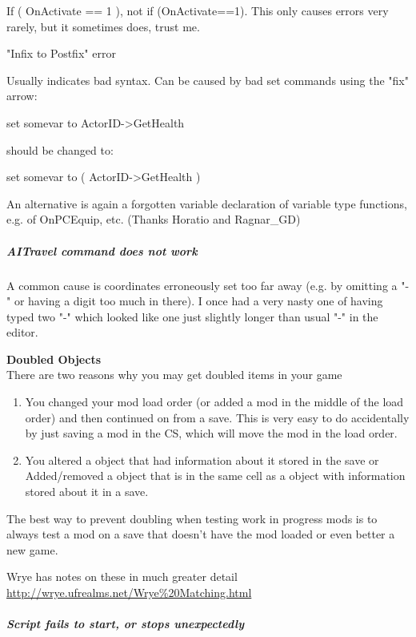 If ( OnActivate == 1 ), not if (OnActivate==1). This only causes errors
very rarely, but it sometimes does, trust me.

"Infix to Postfix" error

Usually indicates bad syntax. Can be caused by bad set commands using
the "fix" arrow:

set somevar to ActorID-\textgreater GetHealth

should be changed to:

set somevar to ( ActorID-\textgreater GetHealth )

An alternative is again a forgotten variable declaration of variable
type functions, e.g. of OnPCEquip, etc. (Thanks Horatio and Ragnar\_GD)

\hypertarget{aitravel-command-does-not-work}{%
\subparagraph{AITravel command does not
work}\label{aitravel-command-does-not-work}}

A common cause is coordinates erroneously set too far away (e.g. by
omitting a "-" or having a digit too much in there). I once had a very
nasty one of having typed two "-" which looked like one just slightly
longer than usual "-" in the editor.

\textbf{Doubled Objects\\
}There are two reasons why you may get doubled items in your game

\begin{enumerate}
\def\labelenumi{\arabic{enumi}.}
\item
  You changed your mod load order (or added a mod in the middle of the
  load order) and then continued on from a save. This is very easy to do
  accidentally by just saving a mod in the CS, which will move the mod
  in the load order.
\item
  You altered a object that had information about it stored in the save
  or Added/removed a object that is in the same cell as a object with
  information stored about it in a save.
\end{enumerate}

The best way to prevent doubling when testing work in progress mods is
to always test a mod on a save that doesn't have the mod loaded or even
better a new game.

Wrye has notes on these in much greater detail
\url{http://wrye.ufrealms.net/Wrye\%20Matching.html}

\hypertarget{script-fails-to-start-or-stops-unexpectedly}{%
\subparagraph{Script fails to start, or stops
unexpectedly}\label{script-fails-to-start-or-stops-unexpectedly}}

